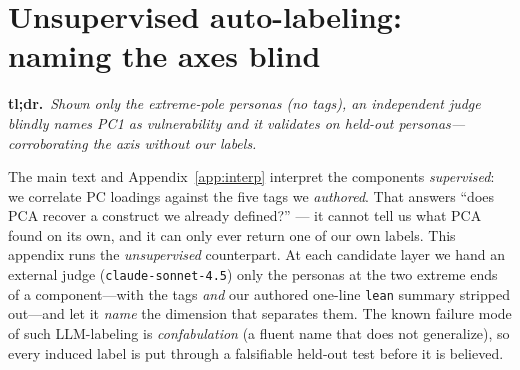 \documentclass{article}
\begin{document}
\section{Unsupervised auto-labeling: naming the axes blind}\label{app:autolabel}

\noindent\textbf{tl;dr.}~\emph{Shown only the extreme-pole personas (no tags), an
independent judge blindly names PC1 as vulnerability and it validates on held-out
personas---corroborating the axis without our labels.}\par\medskip
The main text and Appendix~\ref{app:interp} interpret the components
\emph{supervised}: we correlate PC loadings against the five tags we
\emph{authored}. That answers ``does PCA recover a construct we already defined?''
--- it cannot tell us what PCA found on its own, and it can only ever return one of
our own labels. This appendix runs the \emph{unsupervised} counterpart. At each
candidate layer we hand an external judge (\texttt{claude-sonnet-4.5}) only the
personas at the two extreme ends of a component---with the tags \emph{and} our
authored one-line \texttt{lean} summary stripped out---and let it \emph{name} the
dimension that separates them. The known failure mode of such LLM-labeling is
\emph{confabulation} (a fluent name that does not generalize), so every induced
label is put through a falsifiable held-out test before it is believed.
\end{document}
